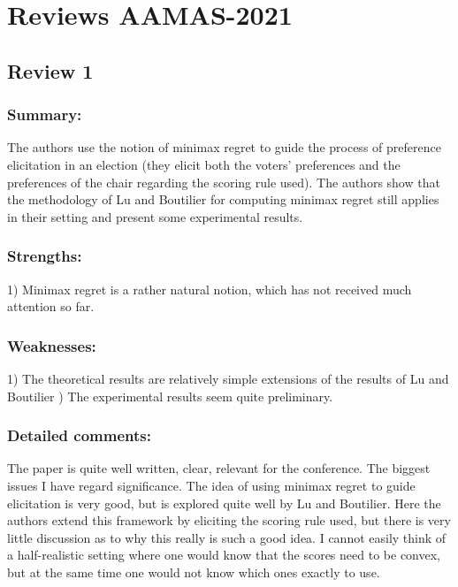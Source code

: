 \documentclass[version=3.21, pagesize, twoside=off, bibliography=totoc, DIV=calc, fontsize=12pt, a4paper]{scrartcl}
\begin{document}
\section{Reviews AAMAS-2021}
\subsection*{Review 1}
\subsubsection*{Summary:}	The authors use the notion of minimax regret to guide the process of preference elicitation in an election (they elicit both the voters' preferences and the preferences of the chair regarding the scoring rule used). The authors show that the methodology of Lu and Boutilier for computing minimax regret still applies in their setting and present some experimental results.
\subsubsection*{Strengths:}	1) Minimax regret is a rather natural notion, which has not received much attention so far.
\subsubsection*{Weaknesses:}
1) The theoretical results are relatively simple extensions of the results of Lu and Boutilier
) The experimental results seem quite preliminary.

\subsubsection*{Detailed comments:}	The paper is quite well written, clear, relevant for the conference. The biggest issues I have regard significance. The idea of using minimax regret to guide elicitation is very good, but is explored quite well by Lu and Boutilier. Here the authors extend this framework by eliciting the scoring rule used, but there is very little discussion as to why this really is such a good idea. I cannot easily think of a half-realistic setting where one would know that the scores need to be convex, but at the same time one would not know which ones exactly to use.
\end{document}

